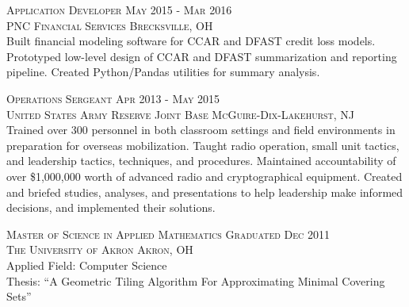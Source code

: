 \documentclass[letterpaper, 11pt]{article} %
\begin{document}
\textsc{Application Developer \hfill May 2015 - Mar 2016} \\
\textsc{PNC Financial Services \hfill Brecksville, OH} \\
Built financial modeling software for CCAR and DFAST credit loss models.
Prototyped low-level design of CCAR and DFAST summarization and reporting pipeline.
Created Python/Pandas utilities for summary analysis. 

\textsc{Operations Sergeant \hfill Apr 2013 - May 2015} \\
\textsc{United States Army Reserve \hfill Joint Base McGuire-Dix-Lakehurst, NJ} \\
    Trained over 300 personnel in both classroom settings and field environments in preparation for overseas mobilization.
    Taught radio operation, small unit tactics, and leadership tactics, techniques, and procedures.
    Maintained accountability of over \$1,000,000 worth of advanced radio and cryptographical equipment.
    Created and briefed studies, analyses, and presentations to help leadership make informed decisions, and implemented their solutions.




\hrulefill

\textsc{Master of Science in Applied Mathematics} \hfill \textsc{Graduated Dec 2011} \\
\textsc{The University of Akron \hfill Akron, OH} \\
Applied Field: Computer Science \\
Thesis: ``A Geometric Tiling Algorithm For Approximating Minimal Covering Sets'' \
\end{document}
